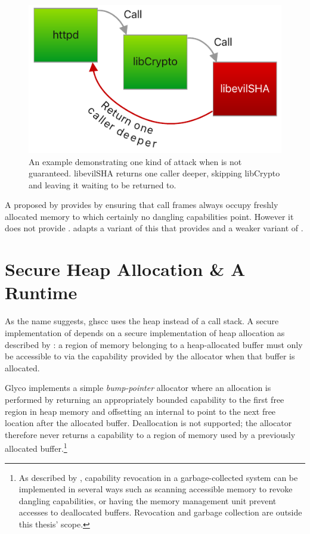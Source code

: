 \documentclass[main.tex]{subfiles}
\begin{document}
\begin{figure}
	\centering
	\includegraphics{Images/No WBCF.pdf}
	\caption{An example demonstrating one kind of attack when  is not guaranteed. libevilSHA returns one caller deeper, skipping libCrypto and leaving it waiting to be returned to.}
	\label{fig:no-wbcf}
\end{figure}

A  proposed by \citet[section~7.3]{cerise} provides  by ensuring that call frames always occupy freshly allocated memory to which certainly no dangling capabilities point. However it does not provide .  adapts a variant of this  that provides  and a weaker variant of .

\section{Secure Heap Allocation \& A Runtime} \label{sct:ghscc-rt}
As the name suggests, \acrlong{ghscc} uses the heap instead of a call stack. A secure implementation of  depends on a secure implementation of heap allocation as described by \citet[section~7.1]{cerise}: a region of memory belonging to a heap-allocated buffer must only be accessible to  via the capability provided by the allocator when that buffer is allocated.

Glyco implements a simple \emph{bump-pointer} allocator where an allocation is performed by returning an appropriately bounded capability to the first free region in heap memory and offsetting an internal \textbf{} to point to the next free location after the allocated buffer. Deallocation is not supported; the allocator therefore never returns a capability to a region of memory used by a previously allocated buffer.\footnote{As described by \citet[section~2.3.16]{cheri}, capability revocation in a garbage-collected system can be implemented in several ways such as scanning accessible memory to revoke dangling capabilities, or having the memory management unit prevent accesses to deallocated buffers. Revocation and garbage collection are outside this thesis' scope.}
\end{document}
